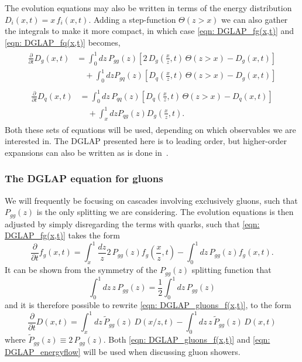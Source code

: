 \documentclass[main.tex]{subfiles}
\begin{document}
The evolution equations may also be written in terms of the energy distribution \(D_i(x,t) = x\, f_i(x,t)\). Adding a step-function \(\Theta(z>x)\) we can also gather the integrals to make it more compact, in which case \autoref{eqn: DGLAP_fg(x,t)} and \autoref{eqn: DGLAP_fq(x,t)} becomes, 
\begin{align}
\begin{split}
    \frac{\partial}{\partial t} D_g(x,t) &= \int_0^1 dz\,P_{gg}(z) \left[2\,D_g\left(\frac{x}{z},t\right)\, \Theta(z>x)-D_g(x,t)\right] \\
    &\quad + \int_0^1 dz P_{gq}(z) \left[ D_q\left(\frac{x}{z},t\right)\, \Theta(z>x) - D_g(x,t)\right]  
\end{split} \label{eqn: DGLAP_Dg(x,t)}
\end{align}
\begin{align}
    \begin{split}
    \frac{\partial}{\partial t} D_q(x,t) &= \int_0^1 dz\,P_{qq}(z) \left[D_q\left(\frac{x}{z},t\right)\, \Theta(z>x)-D_q(x,t)\right] \\
    &\quad + \int_x^1 dz P_{qg}(z) D_g\left(\frac{x}{z},t\right).
    \end{split} \label{eqn: DGLAP_Dq(x,t)}
\end{align}
Both these sets of equations will be used, depending on which observables we are interested in. The DGLAP presented here is to leading order, but higher-order expansions can also be written as is done in~\cite{Dasgupta_2015}.
\subsubsection*{The DGLAP equation for gluons}
We will frequently be focusing on cascades involving exclusively gluons, such that \(P_{gg}(z)\) is the only splitting we are considering. The evolution equations is then adjusted by simply disregarding the terms with quarks, such that \autoref{eqn: DGLAP_fg(x,t)} takes the form
\begin{equation}\label{eqn: DGLAP_gluons_f(x,t)}
    \frac{\partial}{\partial t} f_g(x,t) = \int_x^1 \frac{dz}{z} 2\,P_{gg}(z) f_g\left(\frac{x}{z},t\right) - \int_0^1 dz\, P_{gg}(z) f_g(x,t).
\end{equation}
It can be shown from the symmetry of the \(P_{gg}(z)\) splitting function that 
\begin{equation}\label{eqn: gg_Splitting_identitything}
    \int_0^1 dz \, z \, P_{gg}(z) = \frac{1}{2} \int_0^1 dz\, P_{gg}(z)
\end{equation}
and it is therefore possible to rewrite \autoref{eqn: DGLAP_gluons_f(x,t)}, to the form
\begin{equation}\label{eqn: DGLAP_energyflow}
    \frac{\partial}{\partial t} D(x,t) = \int_x^1 dz \,\tilde P_{gg}(z)\, D(x/z,t) - \int_0^1 dz\, z\, \tilde P_{gg}(z)\, D(x,t)
\end{equation}
where \(\tilde P_{gg}(z) \equiv 2\, P_{gg}(z) \). Both \autoref{eqn: DGLAP_gluons_f(x,t)} and \autoref{eqn: DGLAP_energyflow} will be used when discussing gluon showers.
\end{document}
